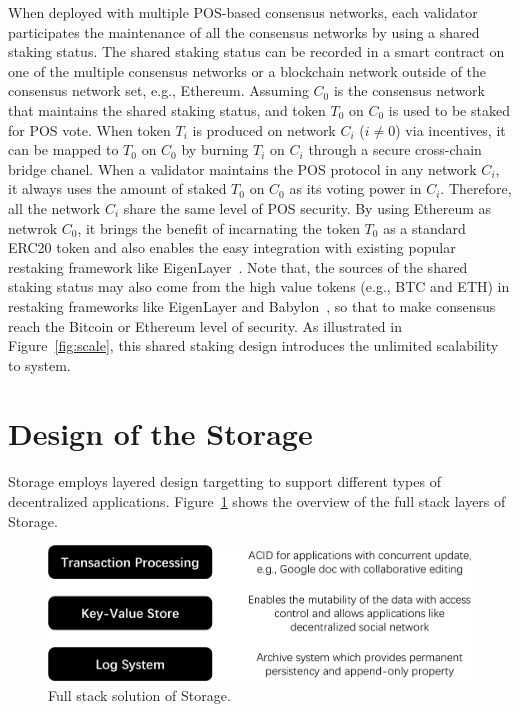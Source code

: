 When deployed with multiple POS-based consensus networks, each validator participates the maintenance of all the consensus networks by using a shared staking status.
The shared staking status can be recorded in a smart contract on one of the multiple consensus networks or a blockchain network outside of the \projabbrev consensus network set, e.g., Ethereum. 
Assuming $C_0$ is the consensus network that maintains the shared staking status, and token $T_0$ on $C_0$ is used to be staked for POS vote.  
When token $T_i$ is produced on network $C_i$ ($i \neq 0$) via incentives, it can be mapped to $T_0$ on $C_0$ by burning $T_i$ on $C_i$ through a secure cross-chain bridge chanel.
When a validator maintains the POS protocol in any network $C_i$, it always uses the amount of staked $T_0$ on $C_0$ as its voting power in $C_i$. 
Therefore, all the network $C_i$ share the same level of POS security. 
By using Ethereum as netwrok $C_0$, it brings the benefit of incarnating the token $T_0$ as a standard ERC20 token and also enables the easy integration with existing popular restaking framework like EigenLayer~\cite{eigenlayer}.
Note that, the sources of the shared staking status may also come from the high value tokens (e.g., BTC and ETH) in restaking frameworks like EigenLayer and Babylon~\cite{babylon}, so that to make \projabbrev consensus reach the Bitcoin or Ethereum level of security.  
As illustrated in Figure~\ref{fig:scale}, this shared staking design introduces the unlimited scalability to \projabbrev system.

\section{Design of the \projabbrev Storage}


\projabbrev Storage employs layered design targetting to support different types of decentralized applications. Figure~\ref{fig:stack} shows the overview of the full stack layers of \projabbrev Storage. 

\begin{figure}[H]	
	\includegraphics[width=\textwidth]{figure/stack-crop.pdf}
	\caption{Full stack solution of \projabbrev Storage.}
	\label{fig:stack}
\end{figure}

